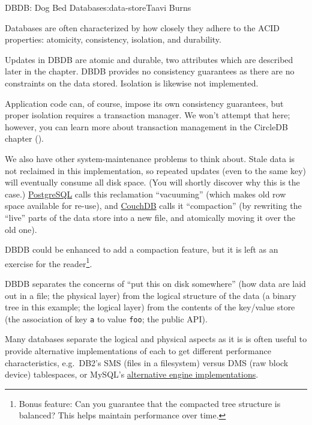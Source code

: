 \begin{aosachapter}{DBDB: Dog Bed Database}{s:data-store}{Taavi Burns}
\label{characterizing-failure}

Databases are often characterized by how closely they adhere to the ACID
properties: atomicity, consistency, isolation, and durability.

Updates in DBDB are atomic and durable, two attributes which are
described later in the chapter. DBDB provides no consistency guarantees
as there are no constraints on the data stored. Isolation is likewise
not implemented.

Application code can, of course, impose its own consistency guarantees,
but proper isolation requires a transaction manager. We won't attempt
that here; however, you can learn more about transaction management in
the CircleDB chapter ().

We also have other system-maintenance problems to think about. Stale
data is not reclaimed in this implementation, so repeated updates (even
to the same key) will eventually consume all disk space. (You will
shortly discover why this is the case.)
\href{http://www.postgresql.org/}{PostgreSQL} calls this reclamation
``vacuuming'' (which makes old row space available for re-use), and
\href{http://couchdb.apache.org/}{CouchDB} calls it ``compaction'' (by
rewriting the ``live'' parts of the data store into a new file, and
atomically moving it over the old one).

DBDB could be enhanced to add a compaction feature, but it is left as an
exercise for the reader\footnote{Bonus feature: Can you guarantee that
  the compacted tree structure is balanced? This helps maintain
  performance over time.}.

\label{the-architecture-of-dbdb}

DBDB separates the concerns of ``put this on disk somewhere'' (how data
are laid out in a file; the physical layer) from the logical structure
of the data (a binary tree in this example; the logical layer) from the
contents of the key/value store (the association of key \texttt{a} to
value \texttt{foo}; the public API).

Many databases separate the logical and physical aspects as it is is
often useful to provide alternative implementations of each to get
different performance characteristics, e.g.~DB2's SMS (files in a
filesystem) versus DMS (raw block device) tablespaces, or MySQL's
\href{http://dev.mysql.com/doc/refman/5.7/en/storage-engines.html}{alternative
engine implementations}.


\end{aosachapter}
